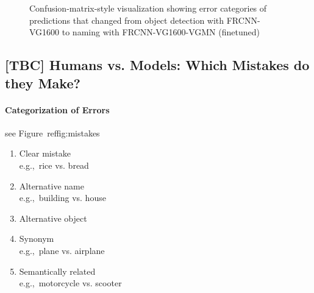 \begin{figure}[t]
	\caption{Confusion-matrix-style visualization showing error categories of predictions that changed from object detection with FRCNN-VG1600 to naming with FRCNN-VG1600-VGMN (finetuned) \label{fig:exp_confusions}}
\end{figure}

\subsection{[TBC] Humans vs. Models: Which Mistakes do they Make?}
\label{sect:exp_analysis}

\paragraph{Categorization of Errors}
see Figure\ ref{fig:mistakes}
\begin{enumerate}
	\item Clear mistake \\
	e.g.,\ rice vs. bread
	\item Alternative name\\
	e.g.,\ building vs. house
	\item Alternative object 
	\item Synonym\\
	e.g.,\ plane vs. airplane
	\item Semantically related\\
	e.g.,\  motorcycle vs. scooter
\end{enumerate}

